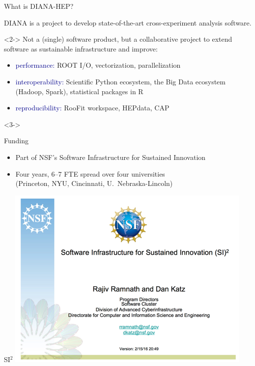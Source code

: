 \documentclass{beamer}
\begin{document}
\begin{frame}{What is DIANA-HEP?}

\begin{block}{}
\vspace{-0.25 cm}
DIANA is a project to develop state-of-the-art cross-experiment analysis software.

\vspace{0.25 cm}
\begin{uncoverenv}<2->
Not a (single) software product, but a collaborative project to extend software as sustainable infrastructure and improve:
\begin{itemize}
\item \textcolor{darkblue}{performance:} ROOT I/O, vectorization, parallelization
\item \textcolor{darkblue}{interoperability:} Scientific Python ecosystem, the Big Data ecosystem (Hadoop, Spark), statistical packages in R
\item \textcolor{darkblue}{reproducibility:} RooFit workspace, HEPdata, CAP
\end{itemize}
\end{uncoverenv}
\end{block}

\begin{uncoverenv}<3->
\begin{block}{Funding}
\begin{itemize}
\item Part of NSF's Software Infrastructure for Sustained Innovation
\item Four years, 6--7 FTE spread over four universities \\ (Princeton, NYU, Cincinnati, U.\ Nebraska-Lincoln)
\end{itemize}
\end{block}
\end{uncoverenv}
\end{frame}

\begin{frame}{SI$^2$}
\vspace{0.4 cm}
\includegraphics[width=\linewidth]{si2_cover.png}
\end{frame}
\end{document}
